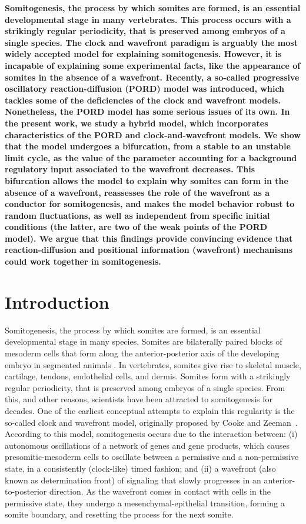 \documentclass[%
 preprint,
 aip, 
 amsmath,amssymb,
]{revtex4-2}
\begin{document}
\textbf{
Somitogenesis, the process by which somites are formed, is an essential developmental stage in many vertebrates. This process occurs with a strikingly regular periodicity, that is preserved among embryos of a single species. The clock and wavefront paradigm is arguably the most widely accepted model for explaining somitogenesis. However, it is incapable of explaining some experimental facts, like the appearance of somites in the absence of a wavefront. Recently, a so-called progressive oscillatory reaction-diffusion (PORD) model was introduced, which tackles some of the deficiencies of the clock and wavefront models. Nonetheless, the PORD model has some serious issues of its own. In the present work, we study a hybrid model, which incorporates characteristics of the PORD and clock-and-wavefront models. We show that the model undergoes a bifurcation, from a stable to an unstable limit cycle, as the value of the parameter accounting for a background regulatory input associated to the wavefront decreases. This bifurcation allows the model to explain why somites can form in the absence of a wavefront, reassesses the role of the wavefront as a conductor for somitogenesis, and makes the model behavior robust to random fluctuations, as  well as independent from specific initial conditions (the latter, are two of the weak points of the PORD model). We argue that this findings provide convincing evidence that reaction-diffusion and positional information (wavefront) mechanisms could work together in somitogenesis.	
}

\section{Introduction}
\label{intro}

Somitogenesis, the process by which somites are formed, is an essential developmental stage in many species. Somites are bilaterally paired blocks of mesoderm cells that form along the anterior-posterior axis of the developing embryo in segmented animals \cite{Maroto2012}. In vertebrates, somites give rise to skeletal muscle, cartilage, tendons, endothelial cells, and dermis. Somites form with a strikingly regular periodicity, that is preserved among embryos of a single species. From this, and other reasons, scientists have been attracted to somitogenesis for decades. One of the earliest conceptual attempts to explain this regularity is the so-called clock and wavefront model, originally proposed by Cooke and Zeeman~\cite{Cooke1976}. According to this model, somitogenesis occurs due to the interaction between: (i) autonomous oscillations of a network of genes and gene products, which causes presomitic-mesoderm cells to oscillate between a permissive and a non-permissive state, in a consistently (clock-like) timed fashion; and (ii) a wavefront (also known as determination front) of signaling that slowly progresses in an anterior-to-posterior direction. As the wavefront comes in contact with cells in the permissive state, they undergo a mesenchymal-epithelial transition, forming a somite boundary, and resetting the process for the next somite.
	
\end{document}

